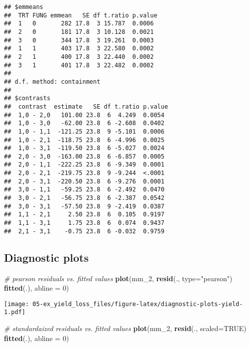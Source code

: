 \documentclass[]{book}
\newenvironment{Shaded}{\begin{snugshade}}{\end{snugshade}}
\newcommand{\CommentTok}[1]{\textcolor[rgb]{0.56,0.35,0.01}{\textit{#1}}}
\newcommand{\DataTypeTok}[1]{\textcolor[rgb]{0.13,0.29,0.53}{#1}}
\newcommand{\DecValTok}[1]{\textcolor[rgb]{0.00,0.00,0.81}{#1}}
\newcommand{\KeywordTok}[1]{\textcolor[rgb]{0.13,0.29,0.53}{\textbf{#1}}}
\newcommand{\NormalTok}[1]{#1}
\newcommand{\OperatorTok}[1]{\textcolor[rgb]{0.81,0.36,0.00}{\textbf{#1}}}
\newcommand{\OtherTok}[1]{\textcolor[rgb]{0.56,0.35,0.01}{#1}}
\newcommand{\StringTok}[1]{\textcolor[rgb]{0.31,0.60,0.02}{#1}}
\begin{document}
\begin{verbatim}
## $emmeans
##  TRT FUNG emmean   SE df t.ratio p.value
##  1   0       282 17.8  3 15.787  0.0006 
##  2   0       181 17.8  3 10.128  0.0021 
##  3   0       344 17.8  3 19.261  0.0003 
##  1   1       403 17.8  3 22.580  0.0002 
##  2   1       400 17.8  3 22.440  0.0002 
##  3   1       401 17.8  3 22.482  0.0002 
## 
## d.f. method: containment 
## 
## $contrasts
##  contrast  estimate   SE df t.ratio p.value
##  1,0 - 2,0   101.00 23.8  6  4.249  0.0054 
##  1,0 - 3,0   -62.00 23.8  6 -2.608  0.0402 
##  1,0 - 1,1  -121.25 23.8  9 -5.101  0.0006 
##  1,0 - 2,1  -118.75 23.8  6 -4.996  0.0025 
##  1,0 - 3,1  -119.50 23.8  6 -5.027  0.0024 
##  2,0 - 3,0  -163.00 23.8  6 -6.857  0.0005 
##  2,0 - 1,1  -222.25 23.8  6 -9.349  0.0001 
##  2,0 - 2,1  -219.75 23.8  9 -9.244  <.0001 
##  2,0 - 3,1  -220.50 23.8  6 -9.276  0.0001 
##  3,0 - 1,1   -59.25 23.8  6 -2.492  0.0470 
##  3,0 - 2,1   -56.75 23.8  6 -2.387  0.0542 
##  3,0 - 3,1   -57.50 23.8  9 -2.419  0.0387 
##  1,1 - 2,1     2.50 23.8  6  0.105  0.9197 
##  1,1 - 3,1     1.75 23.8  6  0.074  0.9437 
##  2,1 - 3,1    -0.75 23.8  6 -0.032  0.9759
\end{verbatim}

\hypertarget{diagnostic-plots-2}{%
\subsection{Diagnostic plots}\label{diagnostic-plots-2}}

\begin{Shaded}
\begin{Highlighting}[]
\CommentTok{# pearson residuals vs. fitted values}
\KeywordTok{plot}\NormalTok{(mm_}\DecValTok{2}\NormalTok{, }\KeywordTok{resid}\NormalTok{(., }\DataTypeTok{type=}\StringTok{"pearson"}\NormalTok{) }\OperatorTok{~}\StringTok{ }\KeywordTok{fitted}\NormalTok{(.), }\DataTypeTok{abline =} \DecValTok{0}\NormalTok{)}
\end{Highlighting}
\end{Shaded}

\texttt{[image: 05-ex\_yield\_loss\_files/figure-latex/diagnostic-plots-yield-1.pdf]}

\begin{Shaded}
\begin{Highlighting}[]
\CommentTok{# standardaized residuals vs. fitted values}
\KeywordTok{plot}\NormalTok{(mm_}\DecValTok{2}\NormalTok{, }\KeywordTok{resid}\NormalTok{(., }\DataTypeTok{scaled=}\OtherTok{TRUE}\NormalTok{) }\OperatorTok{~}\StringTok{ }\KeywordTok{fitted}\NormalTok{(.), }\DataTypeTok{abline =} \DecValTok{0}\NormalTok{)}
\end{Highlighting}
\end{Shaded}
\end{document}
